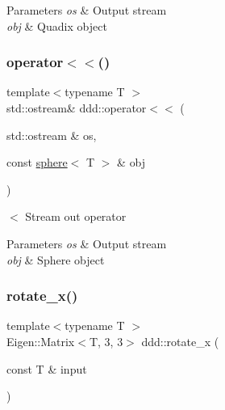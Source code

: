 \begin{DoxyParams}{Parameters}
{\em os} & Output stream \\
\hline
{\em obj} & Quadix object \\
\hline
\end{DoxyParams}
\mbox{\label{namespaceddd_a64dbb41c0ee377eb528907f3448514f6}} 
\subsubsection{\texorpdfstring{operator$<$$<$()}{operator<<()}\hspace{0.1cm}{\footnotesize\ttfamily [10/10]}}
{\footnotesize\ttfamily template$<$typename T $>$ \\
std\+::ostream\& ddd\+::operator$<$$<$ (\begin{DoxyParamCaption}\item[{std\+::ostream \&}]{os,  }\item[{const \hyperlink{classddd_1_1sphere}{sphere}$<$ T $>$ \&}]{obj }\end{DoxyParamCaption})\hspace{0.3cm}{\ttfamily [inline]}}



$<$ Stream out operator 


\begin{DoxyParams}{Parameters}
{\em os} & Output stream \\
\hline
{\em obj} & Sphere object \\
\hline
\end{DoxyParams}
\mbox{\label{namespaceddd_ad45c0a592c1aebe03fc48a0c57d52641}} 
\subsubsection{\texorpdfstring{rotate\+\_\+x()}{rotate\_x()}}
{\footnotesize\ttfamily template$<$typename T $>$ \\
Eigen\+::\+Matrix$<$T, 3, 3$>$ ddd\+::rotate\+\_\+x (\begin{DoxyParamCaption}\item[{const T \&}]{input }\end{DoxyParamCaption})\hspace{0.3cm}{\ttfamily [inline]}}



